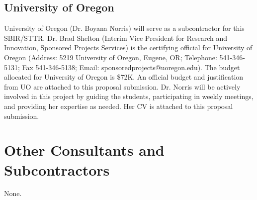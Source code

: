 
\subsection{University of Oregon}


University of Oregon (Dr. Boyana Norris) will serve as a subcontractor for this SBIR/STTR.
Dr. Brad Shelton (Interim Vice President for Research and Innovation, Sponsored Projects Services) is the
certifying official for University of Oregon (Address: 5219 University of Oregon, Eugene, OR;
Telephone: 541-346-5131; Fax 541-346-5138; Email: sponsoredprojects@uoregon.edu). The budget allocated
for University of Oregon is \$72K. An official budget and justification from UO are attached to
this proposal submission. Dr. Norris will be actively involved in this project by guiding the students,
participating in weekly meetings, and providing her expertise as needed. Her CV is attached to this
proposal submission.

\section{Other Consultants and Subcontractors}
None.